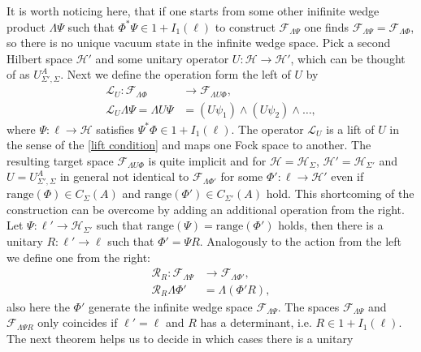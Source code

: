 \documentclass[b5paper,draft,openbib,12pt]{memoir}
\begin{document}
It is worth noticing here, that if one starts from some other
inifinite wedge product \(\mathsf{\Lambda}\Psi\) such that 
\(\Phi^*\Psi \in 1+I_1(\ell)\) to construct 
\(\mathcal{F}_{\mathsf{\Lambda} \Psi}\) one finds 
\(\mathcal{F}_{\mathsf{\Lambda} \Psi}=\mathcal{F}_{\mathsf{\Lambda} \Phi}\),
so there is no unique vacuum state in the infinite wedge space.
Pick a second Hilbert space \(\mathcal{H}'\) and some unitary 
operator \(U:\mathcal{H}\rightarrow \mathcal{H}'\), which 
can be thought of as \(U^A_{\Sigma',\Sigma}\). Next we define 
the operation form the left of \(U\) by 
\begin{align}
  \mathcal{L}_{U}:\mathcal{F}_{\mathsf{\Lambda}\Phi}&\rightarrow \mathcal{F}_{\mathsf{\Lambda}U\Phi}, \\
  \mathcal{L}_U \mathsf{\Lambda}\Psi= \mathsf{\Lambda}U\Psi&= (U\psi_1)\wedge (U\psi_2)\wedge\dots, 
\end{align}
where \(\Psi:\ell\rightarrow \mathcal{H}\) satisfies 
\(\Psi^*\Phi\in 1+I_1(\ell)\). The operator \(\mathcal{L}_U\)
is a lift of \(U\) in the sense of the
\eqref{lift condition} and maps one Fock space 
to another. 
The resulting target space 
\(\mathcal{F}_{\mathsf{\Lambda}U\Phi}\) is quite implicit 
and for \(\mathcal{H}=\mathcal{H}_{\Sigma}\),
\(\mathcal{H}'=\mathcal{H}_{\Sigma'}\) and 
\(U=U^A_{\Sigma',\Sigma}\) in general not identical to 
\(\mathcal{F}_{\mathsf{\Lambda}\Phi'}\) for some 
\(\Phi':\ell \rightarrow \mathcal{H}'\) even if 
\(\mathrm{range}(\Phi)\in C_\Sigma(A) \) and 
\(\mathrm{range}(\Phi')\in C_{\Sigma'}(A)\) hold. 
This shortcoming of the construction can be overcome 
by adding an additional operation from the right.
Let \(\Psi:\ell' \rightarrow \mathcal{H}_{\Sigma'}\) such 
that \(\mathrm{range}(\Psi)=\mathrm{range}(\Phi')\)
holds, then there is a unitary 
\(R:\ell'\rightarrow \ell\) such that 
\(\Phi'=\Psi R\). Analogously to the action from the left
we define one from the right:
\begin{align}
  \mathcal{R}_{R}:\mathcal{F}_{\mathsf{\Lambda}\Psi}&\rightarrow \mathcal{F}_{\mathsf{\Lambda}\Phi'}, \\
  \mathcal{R}_R \mathsf{\Lambda}\Phi'&= \mathsf{\Lambda}(\Phi' R),
\end{align}
also here the \(\Phi'\) generate the infinite wedge space 
\(\mathcal{F}_{\mathsf{\Lambda}\Psi}\). The spaces 
\(\mathcal{F}_{\mathsf{\Lambda}\Psi}\) and 
\(\mathcal{F}_{\mathsf{\Lambda}\Psi R}\) only coincides if 
\(\ell'=\ell\) and
\(R\) has a determinant, i.e. \(R\in 1+I_1(\ell)\). The next
theorem helps us to decide in which cases there is a unitary 
\end{document}
